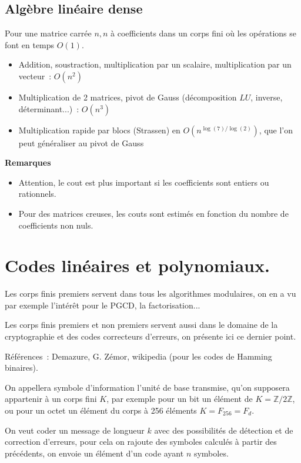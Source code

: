 \documentclass[a4paper,11pt]{book}
\begin{document}
\begin{giacjshere}
\subsection{Alg\`ebre lin\'eaire dense}
Pour une matrice carr\'ee $n,n$ \`a coefficients dans un corps fini o\`u
les op\'erations se font en temps $O(1)$.
\begin{itemize}
\item Addition, soustraction, multiplication par un scalaire,
multiplication par un vecteur~: $O(n^2)$
\item Multiplication de 2 matrices, pivot de Gauss
(d\'ecomposition $LU$, inverse, d\'eterminant...)~: $O(n^3)$
\item Multiplication rapide par blocs (Strassen) en $O(n^{\log(7)/\log(2)})$,
que l'on peut g\'en\'eraliser au pivot de Gauss
\end{itemize}

{\bf Remarques}
\begin{itemize}
\item Attention, le cout est plus important si les coefficients sont entiers
ou rationnels.
\item Pour des matrices creuses, les couts sont estim\'es en fonction du nombre
de coefficients non nuls.
\end{itemize}

\pagebreak

\section{Codes lin\'eaires et polynomiaux.}
 
Les corps finis premiers servent dans tous les algorithmes modulaires,
on en a vu par exemple l'int\'er\^et pour le PGCD, la factorisation...

Les corps finis premiers et non premiers servent aussi dans le
domaine de la cryptographie et des codes correcteurs d'erreurs, 
on pr\'esente ici ce dernier point.

R\'ef\'erences~: Demazure, G. Z\'emor, wikipedia (pour les codes de
Hamming binaires).
 
On appellera symbole d'information l'unit\'e de base transmise, qu'on
supposera appartenir à un corps fini $K$, par
exemple pour un bit un élément de $K=\mathbb{Z}/2\mathbb{Z}$, ou pour un octet 
un \'el\'ement du corps à 256 éléments $K=F_{256}=F_d$.

On veut coder un message de longueur $k$ avec des possibilit\'es
de d\'etection et de correction d'erreurs, pour cela on rajoute
des symboles calcul\'es \`a partir des pr\'ec\'edents, 
on envoie un \'el\'ement d'un code ayant $n$ symboles.


\end{giacjshere}
\end{document}
